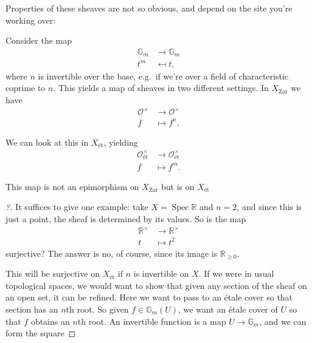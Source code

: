 Properties of these sheaves are not so obvious, and depend on the site
you're working over:

\begin{example}[?]

Consider the map
\begin{align*}  
{\mathbb{G}}_m &\to {\mathbb{G}}_m \\
t^m &\mapsfrom t
,\end{align*}
where \(n\) is invertible over the base, e.g.~if we're over a field of
characteristic coprime to \(n\). This yields a map of sheaves in two
different settings. In \(X_{\mathrm{Zar}}\) we have
\begin{align*}  
{\mathcal{O}}^{\times}&\to {\mathcal{O}}^{\times}\\
f &\mapsto f^n
.\end{align*}

We can look at this in \(X_{\text{ét}}\), yielding
\begin{align*}  
{\mathcal{O}}_\text{ét}^{\times}&\to {\mathcal{O}}_\text{ét}^{\times}\\
f &\mapsto f^m
.\end{align*}

\begin{claim}

This map is not an epimorphism on \(X_{\mathrm{Zar}}\) but is on
\(X_{\text{ét}}\)

\end{claim}

\begin{proof}[?]

It suffices to give one example: take
\(X = \operatorname{Spec}{\mathbb{R}}\) and \(n=2\), and since this is
just a point, the sheaf is determined by its values. So is the map
\begin{align*}  
{\mathbb{R}}^{\times}&\to {\mathbb{R}}^{\times}\\
t &\mapsto t^2
\end{align*}
surjective? The answer is no, of course, since its image is
\({\mathbb{R}}_{\geq 0}\).

This will be surjective on \(X_{\text{ét}}\) if \(n\) is invertible on
\(X\). If we were in usual topological spaces, we would want to show
that given any section of the sheaf on an open set, it can be refined.
Here we want to pass to an étale cover so that section has an \(n\)th
root. So given \(f\in {\mathbb{G}}_m(U)\), we want an étale cover of
\(U\) so that \(f\) obtains an \(n\)th root. An invertible function is a
map \(U\to {\mathbb{G}}_m\), and we can form the square


\end{proof}
\end{example}
